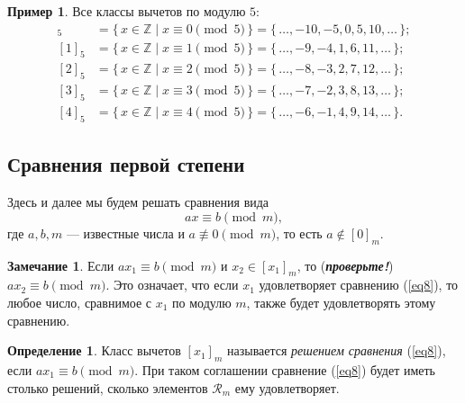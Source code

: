 \documentclass[14pt, a4paper]{extarticle}
\theoremstyle{definition}
\newtheorem*{definition}{Определение}
\newtheorem*{remark}{Замечание}
\newtheorem{example}{Пример}
\begin{document}
	\begin{example}
		Все классы вычетов по модулю $5$:
		\begin{align*}
			[0]_5&=\{\,x\in\mathbb{Z}\mid x\equiv 0\pmod{5}\,\}=\{\,\dots,-10,-5,0,5,10,\dots\,\};\\
			[1]_5&=\{\,x\in\mathbb{Z}\mid x\equiv 1\pmod{5}\,\}=\{\,\dots,-9,-4,1,6,11,\dots\,\};\\
			[2]_5&=\{\,x\in\mathbb{Z}\mid x\equiv 2\pmod{5}\,\}=\{\,\dots,-8,-3,2,7,12,\dots\,\};\\
			[3]_5&=\{\,x\in\mathbb{Z}\mid x\equiv 3\pmod{5}\,\}=\{\,\dots,-7,-2,3,8,13,\dots\,\};\\
			[4]_5&=\{\,x\in\mathbb{Z}\mid x\equiv 4\pmod{5}\,\}=\{\,\dots,-6,-1,4,9,14,\dots\,\}.
		\end{align*}
	\end{example}

\subsection{Сравнения первой степени}
\label{srx}

	Здесь и далее мы будем решать сравнения вида
	\begin{equation}
	\label{eq8}
		ax\equiv b\pmod{m},
	\end{equation}
	где $a,b,m$ --- известные числа и $a\not\equiv0\pmod{m}$, то есть $a\notin[0]_m$.
	
	\begin{remark}
		Если $ax_1\equiv b\pmod{m}$ и $x_2\in[x_1]_m$, то (\textbf{\textit{проверьте!}}) $ax_2\equiv b\pmod{m}$. Это означает, что если $x_1$ удовлетворяет сравнению (\ref{eq8}), то любое число, сравнимое с $x_1$ по модулю $m$, также будет удовлетворять этому сравнению.
	\end{remark}
	
	\begin{definition}
		Класс вычетов $[x_1]_m$ называется \emph{решением сравнения} (\ref{eq8}), если $ax_1\equiv b\pmod{m}$. При таком соглашении сравнение (\ref{eq8}) будет иметь столько решений, сколько элементов $\mathcal{R}_m$ ему удовлетворяет. 
	\end{definition}
\end{document}
